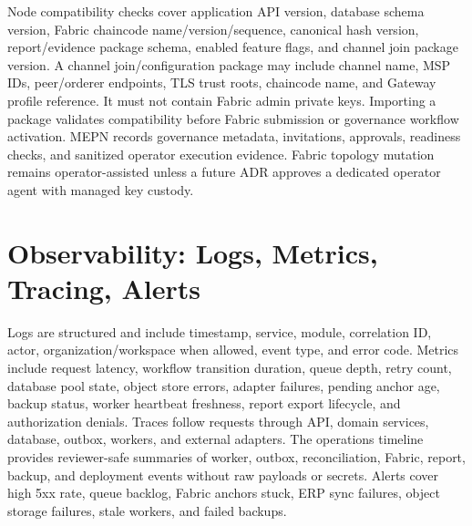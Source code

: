 \documentclass[11pt,a4paper]{article}
\begin{document}
Node compatibility checks cover application API version, database schema version, Fabric chaincode name/version/sequence, canonical hash version, report/evidence package schema, enabled feature flags, and channel join package version. A channel join/configuration package may include channel name, MSP IDs, peer/orderer endpoints, TLS trust roots, chaincode name, and Gateway profile reference. It must not contain Fabric admin private keys. Importing a package validates compatibility before Fabric submission or governance workflow activation. MEPN records governance metadata, invitations, approvals, readiness checks, and sanitized operator execution evidence. Fabric topology mutation remains operator-assisted unless a future ADR approves a dedicated operator agent with managed key custody.

\section{Observability: Logs, Metrics, Tracing, Alerts}
Logs are structured and include timestamp, service, module, correlation ID, actor, organization/workspace when allowed, event type, and error code. Metrics include request latency, workflow transition duration, queue depth, retry count, database pool state, object store errors, adapter failures, pending anchor age, backup status, worker heartbeat freshness, report export lifecycle, and authorization denials. Traces follow requests through API, domain services, database, outbox, workers, and external adapters. The operations timeline provides reviewer-safe summaries of worker, outbox, reconciliation, Fabric, report, backup, and deployment events without raw payloads or secrets. Alerts cover high 5xx rate, queue backlog, Fabric anchors stuck, ERP sync failures, object storage failures, stale workers, and failed backups.
\end{document}
